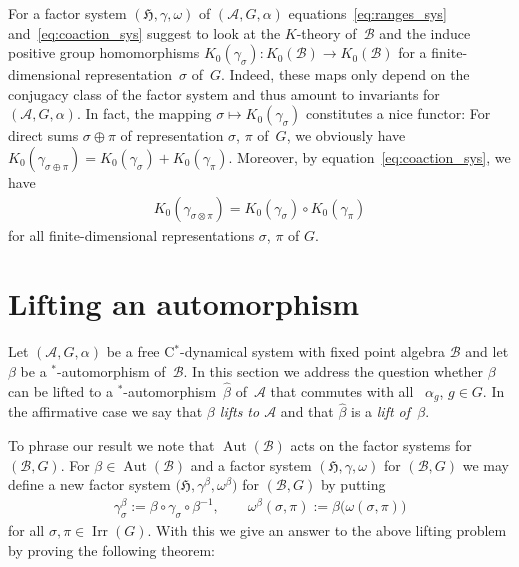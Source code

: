 \documentclass[pdftex]{sigma}
\numberwithin{equation}{section}
\newcommand*{\tensor}{\otimes}		%
\DeclareMathOperator{\Aut}{Aut}
\newcommand*{\Star}{$^*$\nobreakdash}
\newcommand*{\hilb}{\mathfrak}		%
\newcommand*{\alg}{\mathcal}		%
\newcommand*{\hH}{\hilb{H}}			%
\newcommand*{\aA}{\alg{A}}			%
\newcommand*{\aB}{\alg{B}} 			%
\DeclareMathOperator{\Irrep}{Irr} 			%
\begin{document}
\begin{Remark}\label{rem:K0_factor_sys}
For a factor system $(\hH, \gamma, \omega)$ of $(\aA,G,\alpha)$ equations~\eqref{eq:ranges_sys} and~\eqref{eq:coaction_sys} suggest to look at the $K$-theory of~$\aB$ and the induce positive group homomorphisms $K_0(\gamma_\sigma)\colon K_0(\aB) \to K_0(\aB)$ for a finite-dimensional representation~$\sigma$ of~$G$.
	Indeed, these maps only depend on the conjugacy class of the factor system and thus amount to invariants for $(\aA, G, \alpha)$.
	In fact, the mapping $\sigma \mapsto K_0(\gamma_\sigma)$ constitutes a nice functor:
	For direct sums $\sigma \oplus \pi$ of representation $\sigma$, $\pi$ of~$G$, we obviously have $K_0(\gamma_{\sigma \oplus \pi}) = K_0(\gamma_\sigma) + K_0(\gamma_\pi)$. Moreover, by equation~\eqref{eq:coaction_sys}, we have
	\begin{gather*}
		K_0(\gamma_{\sigma \tensor \pi}) = K_0(\gamma_\sigma) \circ K_0(\gamma_\pi)
	\end{gather*}
	for all finite-dimensional representations $\sigma$, $\pi$ of $G$.
\end{Remark}

\section{Lifting an automorphism}\label{sec:lift_automorphism}

Let $(\aA, G, \alpha)$ be a free C\Star-dynamical system with fixed point algebra $\aB$ and let $\beta$ be a \Star-auto\-mor\-phism of~$\aB$.
In this section we address the question whether $\beta$ can be lifted to a \Star-automorphism~$\hat \beta$ of~$\aA$ that commutes with all~ $\alpha_g$, $g \in G$.
In the affirmative case we say that \emph{$\beta$ lifts to $\aA$} and that $\hat \beta$ is a \emph{lift of~$\beta$}.

To phrase our result we note that $\Aut(\aB)$ acts on the factor systems for $(\aB,G)$.
For $\beta \in \Aut(\aB)$ and a factor system $(\hH, \gamma, \omega)$ for $(\aB,G)$ we may define a new factor system $\big(\hH, \gamma^\beta, \omega^\beta\big)$ for $(\aB,G)$ by putting
\begin{gather*}
	\gamma^\beta_\sigma
	:= \beta \circ \gamma_\sigma \circ \beta^{-1},
	\qquad
	\omega^\beta(\sigma, \pi)
	:= \beta \bigl( \omega(\sigma, \pi) \bigr)%
\end{gather*}
for all $\sigma, \pi \in \Irrep(G)$.
With this we give an answer to the above lifting problem by proving the following theorem:
\end{document}

